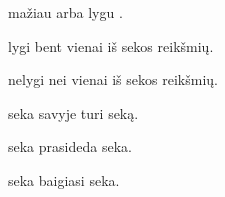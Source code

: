 \documentclass[letterpaper,10pt,lithuanian]{sphinxmanual}
\begin{document}
\begin{fulllineitems}
\begin{fulllineitems}

\pysigstartsignatures
{}
\pysigstopsignatures
\sphinxAtStartPar
{} mažiau arba lygu .

\end{fulllineitems}



\begin{fulllineitems}

\pysigstartsignatures
{}
\pysigstopsignatures
\sphinxAtStartPar
{} lygi bent vienai iš  sekos reikšmių.

\end{fulllineitems}



\begin{fulllineitems}

\pysigstartsignatures
{}
\pysigstopsignatures
\sphinxAtStartPar
{} nelygi nei vienai iš  sekos reikšmių.

\end{fulllineitems}



\begin{fulllineitems}

\pysigstartsignatures
{}
\pysigstopsignatures
\sphinxAtStartPar
{} seka savyje turi  seką.

\end{fulllineitems}



\begin{fulllineitems}

\pysigstartsignatures
{}
\pysigstopsignatures
\sphinxAtStartPar
{} seka prasideda  seka.

\end{fulllineitems}



\begin{fulllineitems}

\pysigstartsignatures
{}
\pysigstopsignatures
\sphinxAtStartPar
{} seka baigiasi  seka.


\end{fulllineitems}
\end{fulllineitems}
\end{document}
